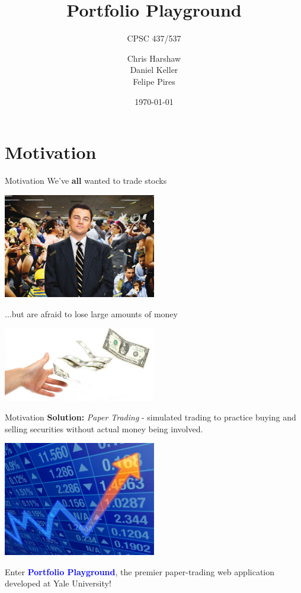 \documentclass{beamer}
\title{Portfolio Playground}
\subtitle{CPSC 437/537}
\author{Chris Harshaw \\ Daniel Keller \\ Felipe Pires}
\date{\today}
\begin{document}
\begin{frame}
  \titlepage
\end{frame}

\section*{Motivation}
\begin{frame}{Motivation}
\centering
We've \textbf{all} wanted to trade stocks 

\pause

\includegraphics[width=0.5\textwidth]{wallstreet_2}

\pause

...but are afraid to lose large amounts of money

\includegraphics[width=0.5\textwidth]{lose_money}
  
\end{frame}

\begin{frame}{Motivation}
\textbf{Solution:} \emph{Paper Trading} -  simulated trading to practice buying and selling securities without actual money being involved.

\begin{center}
\includegraphics[width=0.5\textwidth]{stock_stock}
\end{center}

\pause

Enter \textbf{\textcolor{blue}{ Portfolio Playground}}, the premier paper-trading web application developed at Yale University!


  
\end{frame}
\end{document}

